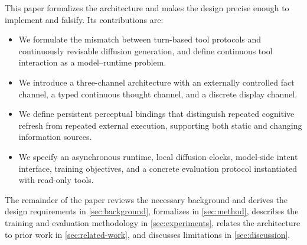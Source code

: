 This paper formalizes the architecture and makes the design precise enough to implement and falsify. Its contributions are:
\begin{itemize}[leftmargin=*]
  \item We formulate the mismatch between turn-based tool protocols and continuously revisable diffusion generation, and define continuous tool interaction as a model--runtime problem.
  \item We introduce a three-channel architecture with an externally controlled fact channel, a typed continuous thought channel, and a discrete display channel.
  \item We define persistent perceptual bindings that distinguish repeated cognitive refresh from repeated external execution, supporting both static and changing information sources.
  \item We specify an asynchronous runtime, local diffusion clocks, model-side intent interface, training objectives, and a concrete evaluation protocol instantiated with read-only tools.
\end{itemize}

The remainder of the paper reviews the necessary background and derives the design requirements in \cref{sec:background}, formalizes \cid in \cref{sec:method}, describes the training and evaluation methodology in \cref{sec:experiments}, relates the architecture to prior work in \cref{sec:related-work}, and discusses limitations in \cref{sec:discussion}.
